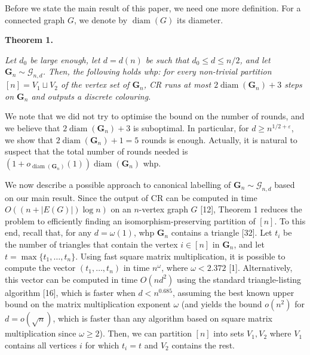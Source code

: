 \documentclass[10pt,a4paper]{article}
\begin{document}
Before we state the main result of this paper, we need one more definition. For a connected graph $G$, we denote by $\operatorname{diam}(G)$ its diameter.\par






\par\medskip\noindent\textbf{
\textbf{Theorem 1}\textbf{.}
}\par



\emph{Let $d_{0}$ be large enough, let $d=d(n)$ be such that $d_{0}\leq d\leq n/2$, and let $\mathbf{G}_{n}\sim\mathcal{G}_{n,d}$. Then, the following holds whp:
for every non-trivial partition $[n]=V_{1}\sqcup V_{2}$ of the vertex set of $\mathbf{G}_{n}$, CR runs at most $2\operatorname{diam}(\mathbf{G}_{n})+3$ steps on $\mathbf{G}_{n}$ and outputs a discrete colouring.}\par







We note that we did not try to optimise the bound on the number of rounds, and we believe that $2\operatorname{diam}(\mathbf{G}_{n})+3$ is suboptimal. In particular, for $d\geq n^{1/2+\varepsilon}$, we show that $2\operatorname{diam}(\mathbf{G}_{n})+1=5$ rounds is enough. Actually, it is natural to suspect that the total number of rounds needed is $(1+o_{\operatorname{diam}(\mathbf{G}_{n})}(1))\operatorname{diam}(\mathbf{G}_{n})$ whp.\par




We now describe a possible approach to canonical labelling of $\mathbf{G}_{n}\sim\mathcal{G}_{n,d}$ based on our main result. Since the output of CR can be computed in time $O((n+|E(G)|)\log n)$ on an $n$-vertex graph $G$ [12], Theorem 1 reduces the problem to efficiently finding an isomorphism-preserving partition of $[n]$. To this end, recall that, for any $d=\omega(1)$, whp $\mathbf{G}_{n}$ contains a triangle [32]. Let $t_{i}$ be the number of triangles that contain the vertex $i\in[n]$ in $\mathbf{G}_{n}$, and let $t=\max\{t_{1},\ldots,t_{n}\}.$ Using fast square matrix multiplication, it is possible to compute the vector $(t_{1},\ldots,t_{n})$ in time $n^{\omega}$, where $\omega<2.372$ [1]. Alternatively, this vector can be computed in time $O(nd^{2})$ using the standard triangle-listing algorithm [16], which is faster when $d<n^{0.685}$, assuming the best known upper bound on the matrix multiplication exponent $\omega$ (and yields the bound $o(n^{2})$ for $d=o(\sqrt{n})$, which is faster than any algorithm based on square matrix multiplication since $\omega\geq 2$). Then, we can partition $[n]$ into sets $V_{1},V_{2}$ where $V_{1}$ contains all vertices $i$ for which $t_{i}=t$ and $V_{2}$ contains the rest.\par
\end{document}
